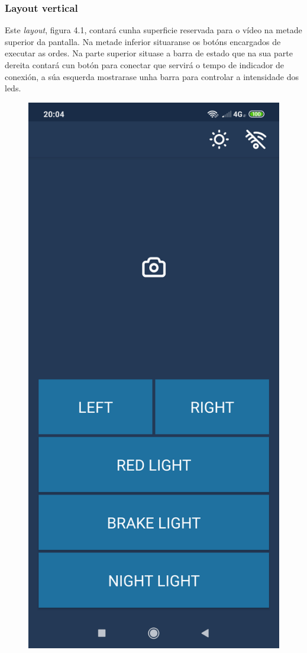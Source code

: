 \subsubsection{Layout vertical}
Este \emph{layout}, figura 4.1, contará cunha superficie reservada para o vídeo na metade superior da pantalla. Na metade inferior situaranse os botóns encargados de executar as ordes. Na parte superior situase a barra de estado que na sua parte dereita contará cun botón para conectar que servirá o tempo de indicador de conexión, a súa esquerda mostrarase unha barra para controlar a intensidade dos leds.
\begin{figure}[tb]
  \centering
  \includegraphics[scale=.1]{imaxes/layout-vertical1.png}

\end{figure}
